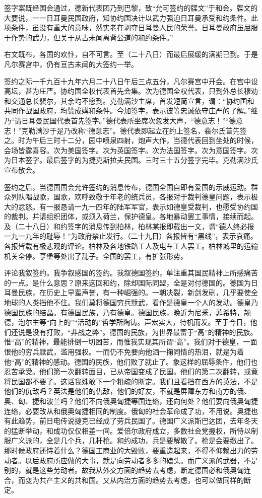签字案既经国会通过，德新代表团乃到巴黎，致“允可签约的牒文”于和会。牒文的大要说，一一日耳曼民国政府，知协约国决计以武力强迫日耳曼承受和约条件。此项条件，虽没有重大的意味，然实老在剥夺日耳曼人民的荣誉。日耳曼政府虽屈服于作势的武力，但关于从古未闻离背公道的和约条件。”

右文既布，各国的欢忭，自不可言。至（二十八日）而最后展缓的满期已到。于是凡尔赛宫中，仍有亘古未闻的大签约一举。

签约之际一千九百十九年六月二十八日午后三点五分，凡尔赛宫中开会。在宫中设高坛，甚为庄严。协约国全权代表首先会集。次为德国全权代表，只到外总长穆劝和交通总长裴尔，其余均不愿到。克勒满沙主席，首发短简宣言，谓：“协约国和共同作战国政府，均赞成媾和条件。今加签字，表示彼等忠诚依守庄严的了解。”继乃“请日耳曼民国代表首先签字。”德代表所坐席次忽发大声，“德意志！”“德意志！”克勒满沙于是乃改称“德意志”。德代表即起立在约上签名，裴尔氏首先签之。时为午后三时十二分，园中喷泉四射，炮声大作，当德代表回到坐处的时候，会场皆露喜容。次为美国签字。次为英国签字。次为法国签字。次为意国签字。次为日本签字。最后签字的为捷克斯拉夫民国。三时三十五分签字完毕。克勒满沙氏宣布散会。

签约之后，当德国国会允许签约的消息传布，德国全国自即有爱国的示威运动。群众列队唱战歌，国歌，欢呼致敬于年老的统兵员，各报对于裁判德皇问题，表示极大的忿怒。有一报恳请一九一四年的陆军军官，表示如德皇受裁判，也愿受协约国的裁判。并请组织团体，或须入荷兰，保护德皇。各地暴动罢工事情，接续而起。及（二十八日）和约签字的消息传到柏林，柏林某报即载出一文，谓“德人终必报一九一九年的耻辱！”为政府禁止发行。（二十九日）各报皆有“黑线”，表示哀痛。各报皆载有极悲观的评论。柏林及各地铁路工人及电车工人罢工。柏林城里的运输机关全停。亨堡等处出了乱子。全国的罢工，有扩张形势。

评论我叙签约。我争叙感国的签约。我叙德国签约，单注重其国民精神上所感痛苦的一点。是什么意思？原来这回和约，除却国际同盟，全是对付德国的。德国为日耳曼民族，在历史上早蜚声誉，有一种崛强的。一朝决裂，新剑发硎，几乎要使全地球的人类挡他不住。我们莫将德国穷兵黩武，看作是德皇一个人的发动。德皇乃德国民族的结晶。有德国民族，乃有德皇。德国民族，晚近为尼釆，菲希特，颉德，泡尔生等“向上的”“活动的”哲学所陶铸。声宏实大，待机而发。至于今日，他们还说是没有打败，“非战之弊”。德国的民族，为世界最富于“高”的精神的民族。惟“高”的精神，最能排倒一切困苦，而惟我实现其所谓“高”。我们对于德皇，一面恨他的穷兵黩武，滥用强权。一而仍不免要向他洒一掬同情的热泪，就是为着他“高”的精神的感动。德国的民族，他们败了就止了。象这样的屈辱条件，他们也忍苦承受。他们第一次翻转面目，已从帝国变成了民国。他们的第二次翻转，或竟将民国都不要了。这话我殊敢下一个粗疏的断定。我们且看挡在西方的英法，不是他们的仇敌吗？英法是他们的仇敌，他们的好友，不就是屏障东方和南方的俄、奥、匈、捷和波兰吗？他们不向俄奥匈捷等国连络，还向何处？他们要向俄奥匈捷连络，必要改从和俄奥匈捷相同的制度。俄匈的社会革命成了功，不用说。奥捷也有此趋势，前日电传说捷克已经成了劳兵民国了。德国广义派斯巴达团，去年冬天的猛断举动，和成功仅仅相差一间。爱倍尔政府成立，多数社会党握权，所恃以制服广义派的，全是几个兵，几杆枪。和约成功，兵是要解散了。枪是会要缴出了。那时候政府还恃着什么？德国工商业的大毁败，要重造起来，不得不仰赖出力的劳动者。以后政府所应做的大事，就是向劳动者多多的磕头。而广义派的武器，不是别的，就是这些劳动者。故我从外交方面的趋势去考虑，断定德国必和俄奥匈连合，而变为共产主义的共和国。又从内治方面的趋势去考虑，也可以做同样的断定。

